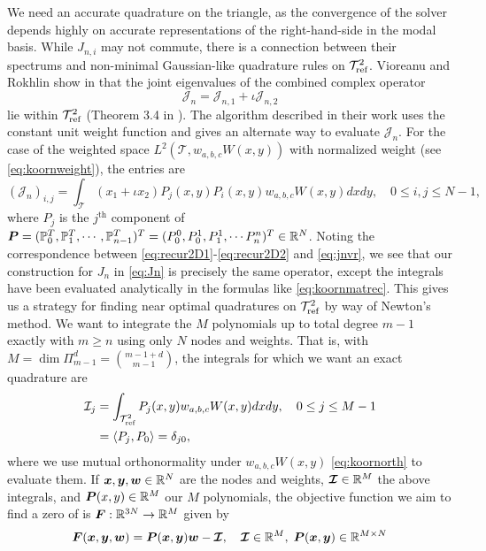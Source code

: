 We need an accurate quadrature on the triangle, as the convergence of the solver depends highly on accurate representations of the right-hand-side in the modal basis. While $J_{n,i}$ may not commute, there is a connection between their spectrums and non-minimal Gaussian-like quadrature rules on $\mathcal{T}_{\text{ref}}^2$. Vioreanu and Rokhlin show in \cite{vrquad} that the joint eigenvalues of the combined complex operator 
\begin{equation}\label{eq:Jn}
	\mathcal{J}_n = \mathcal{J}_{n,1}+\iota \mathcal{J}_{n,2}
\end{equation}	
lie within $\mathcal{T}_{\text{ref}}^2$ (Theorem 3.4 in \cite{vrquad}). The algorithm described in their work uses the constant unit weight function and gives an alternate way to evaluate $\mathcal{J}_{n}$. For the case of the weighted space $L^2(\mathcal{T},w_{a,b,c}W(x,y))$ with normalized weight (see \eqref{eq:koornweight}), the entries are
\begin{equation}\label{eq:jnvr}
(\mathcal{J}_n)_{i,j} = \int_{\mathcal{T}} (x_1+\iota x_2)P_j(x,y)P_i(x,y)w_{a,b,c}W(x,y)dxdy,\quad 0\leq i,j\leq N-1,
\end{equation}
where $P_j$ is the $j^\text{th}$ component of $\boldsymbol{P} = (\mathbb{P}_0^T,\mathbb{P}_1^T,\cdots,\mathbb{P}_{n-1}^T)^T = (P_0^0,P_0^1,P_1^1,\cdots P_n^n)^T \in \mathbb{R}^N$. Noting the correspondence between \eqref{eq:recur2D1}-\eqref{eq:recur2D2} and \eqref{eq:jnvr}, we see that our construction for $J_n$ in \eqref{eq:Jn} is precisely the same operator, except the integrals have been evaluated analytically in the formulas like \eqref{eq:koornmatrec}. This gives us a strategy for finding near optimal quadratures on $\mathcal{T}_{\text{ref}}^2$ by way of Newton's method. We want to integrate the $M$ polynomials up to total degree $m-1$ exactly with $m \geq n$ using only $N$ nodes and weights. That is, with $M=\dim\Pi_{m-1}^d = {m-1+d\choose m-1}$, the integrals for which we want an exact quadrature are
\begin{equation}\label{eq:exactint}
\begin{split}
\mathcal{I}_j &= \int_{\mathcal{T}_{\text{ref}}^2} P_j(x,y)w_{a,b,c}W(x,y)dxdy,\quad 0\leq j \leq M-1\\
&=\langle P_j,P_0\rangle = \delta_{j0},
\end{split}
\end{equation}
where we use mutual orthonormality under $w_{a,b,c}W(x,y)$ \eqref{eq:koornorth} to evaluate them. If $\boldsymbol{x},\boldsymbol{y},\boldsymbol{w} \in \mathbb{R}^N$ are the nodes and weights, $\boldsymbol{\mathcal{I}} \in \mathbb{R}^M$ the above integrals, and $\boldsymbol{P}(x,y)\in \mathbb{R}^M$ our $M$ polynomials, the objective function we aim to find a zero of is $\boldsymbol{F}:\mathbb{R}^{3N}\to\mathbb{R}^M$ given by
\begin{equation}\label{eq:newtobj}
	\boldsymbol{F}(\boldsymbol{x},\boldsymbol{y},\boldsymbol{w}) = \boldsymbol{P}(\boldsymbol{x},\boldsymbol{y})\boldsymbol{w}-\boldsymbol{\mathcal{I}},\quad  \boldsymbol{\mathcal{I}}\in\mathbb{R}^M,\;\boldsymbol{P}(\boldsymbol{x},\boldsymbol{y}) \in \mathbb{R}^{M\times N}
\end{equation}

